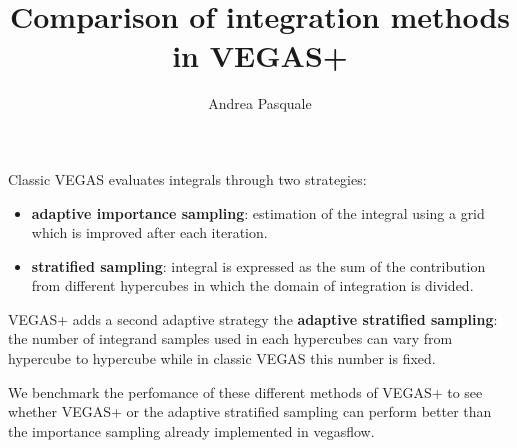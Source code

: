 \documentclass[t,handout,professionalfonts]{beamer}
\title{
	Comparison of integration methods in VEGAS+}
\author{Andrea Pasquale}
\institute{Università degli Studi di Milano - Corso di Laurea Magistrale in Fisica }
\begin{document}
\begin{frame}
\titlepage
\end{frame}

\begin{frame}
	\scriptsize		
	Classic VEGAS evaluates integrals through two strategies:
	\begin{itemize}
		\item \textbf{adaptive importance sampling}: estimation of the integral using a grid which is improved after each iteration.
		\item \textbf{stratified sampling}: integral is expressed as the sum of the contribution from different hypercubes in which the domain of integration is divided.
	\end{itemize}
\vspace{0.7cm}
VEGAS+ adds a second adaptive strategy the \textbf{adaptive stratified sampling}: the number of integrand samples used in each hypercubes can vary from hypercube to hypercube  while in classic VEGAS this number is fixed.

\vspace{0.7cm}
We benchmark the perfomance of these different methods of VEGAS+ to see whether VEGAS+ or the adaptive stratified sampling can perform better than the importance sampling already implemented in vegasflow.
\end{frame}
\end{document}
